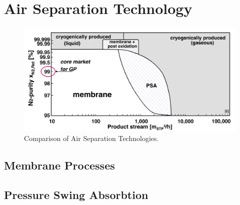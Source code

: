 \chapter{Air Separation Technology}
\label{chp:airsep}

\begin{figure}
	\includegraphics[width=\textwidth]{Pictures/tech_compar}
	\caption{Comparison of Air Separation Technologies.}
	\label{fig:tech_compar}
\end{figure}

\section{Membrane Processes}
\label{sec:membrane}

\section{Pressure Swing Absorbtion}
\label{sec:psa}
